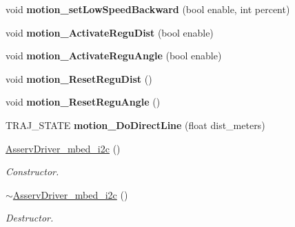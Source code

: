 \begin{DoxyCompactItemize}
void {\bfseries motion\+\_\+set\+Low\+Speed\+Backward} (bool enable, int percent)
\item 
\mbox{\label{classAsservDriver__mbed__i2c_abbe122067f7bab901b67c3d148faaccd}} 
void {\bfseries motion\+\_\+\+Activate\+Regu\+Dist} (bool enable)
\item 
\mbox{\label{classAsservDriver__mbed__i2c_a4b60135063f545a6c686f360ca8c2b88}} 
void {\bfseries motion\+\_\+\+Activate\+Regu\+Angle} (bool enable)
\item 
\mbox{\label{classAsservDriver__mbed__i2c_a6bb232217e5846a7d4935d4d49d79e0f}} 
void {\bfseries motion\+\_\+\+Reset\+Regu\+Dist} ()
\item 
\mbox{\label{classAsservDriver__mbed__i2c_a717a1f7797a4aa778d3c63446746b6a6}} 
void {\bfseries motion\+\_\+\+Reset\+Regu\+Angle} ()
\item 
\mbox{\label{classAsservDriver__mbed__i2c_adf94df7551cf686e5d1e13d2e091e5fa}} 
T\+R\+A\+J\+\_\+\+S\+T\+A\+TE {\bfseries motion\+\_\+\+Do\+Direct\+Line} (float dist\+\_\+meters)
\item 
\mbox{\label{classAsservDriver__mbed__i2c_abf9b34729d42aecfc3f9e39377f642a1}} 
\hyperlink{classAsservDriver__mbed__i2c_abf9b34729d42aecfc3f9e39377f642a1}{Asserv\+Driver\+\_\+mbed\+\_\+i2c} ()
\begin{DoxyCompactList}\small\item\em Constructor. \end{DoxyCompactList}\item 
\mbox{\label{classAsservDriver__mbed__i2c_af142c6fa168ba03f4a3d0646a29f7ad5}} 
\hyperlink{classAsservDriver__mbed__i2c_af142c6fa168ba03f4a3d0646a29f7ad5}{$\sim$\+Asserv\+Driver\+\_\+mbed\+\_\+i2c} ()
\begin{DoxyCompactList}\small\item\em Destructor. \end{DoxyCompactList}\end{DoxyCompactItemize}
